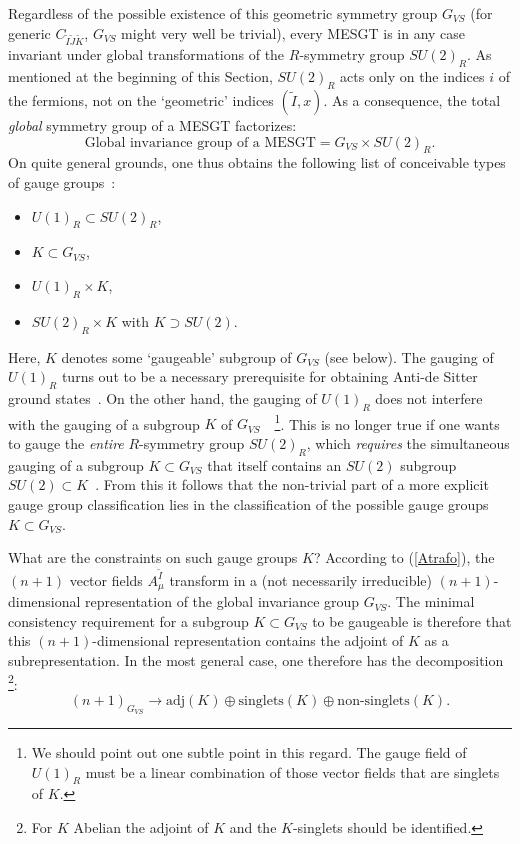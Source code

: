 \documentclass[a4paper,11pt]{article}
\newcommand{\ti}{\ensuremath{\tilde{I}}}
\newcommand{\tj}{\ensuremath{\tilde{J}}}
\newcommand{\tk}{\ensuremath{\tilde{K}}}
\begin{document}
Regardless of the possible existence of this geometric symmetry
group $G_{VS}$ (for generic $C_{\ti\tj\tk}$,  $G_{VS}$ might very
well be trivial), every MESGT is in any case invariant under
global transformations of the $R$-symmetry group $SU(2)_{R}$. As
mentioned at the beginning of this Section, $SU(2)_{R}$
acts only on the indices $i$ of the fermions, not on the
`geometric' indices $ (\ti, x)$. As a consequence, the total
\emph{global} symmetry group of a MESGT factorizes:
\begin{displaymath}
\textrm{Global invariance group of a MESGT}= G_{VS}\times
SU(2)_{R}.
\end{displaymath}
On quite general grounds, one thus
obtains the following list of conceivable types of gauge
groups~\cite{GST2,GZ1,GZ3}:
\begin{itemize}
\item $U(1)_{R}\subset SU(2)_{R}$,
\item $K\subset G_{VS}$,
\item $U(1)_{R}\times K$,
\item $SU(2)_{R}\times K$ with $K\supset SU(2)$.
\end{itemize}

Here, $K$ denotes some `gaugeable' subgroup of $G_{VS}$ (see below). The
gauging of $U(1)_{R}$ turns out to be a necessary prerequisite for
obtaining Anti-de Sitter ground states~\cite{GST2,GZ1,GZ2}. On the other
hand, the gauging of $U(1)_R$ does not interfere with the gauging of a
subgroup $K$ of $G_{VS}$~\cite{GZ1}~\footnote{ We should point out one
subtle point in this regard. The gauge field of $U(1)_R$ must be a linear
combination of those vector fields that are singlets of $K$.}. This is no
longer true if one wants to gauge the \emph{entire} $R$-symmetry group
$SU(2)_{R}$, which \emph{requires} the simultaneous gauging of a subgroup
$K\subset G_{VS}$ that itself contains an $SU(2)$ subgroup $SU(2)\subset
K$~\cite{GZ3}. From this it follows that the non-trivial part of a more
explicit gauge group classification lies in the classification of the
possible gauge groups $K\subset G_{VS}$. 

What are the constraints on such gauge groups $K$? According to
(\ref{Atrafo}), the $(n+1)$ vector fields $A_{\mu}^{\ti}$
transform in a (not necessarily irreducible) $(n+1)$-dimensional
representation of the global invariance group $G_{VS}$. The
minimal consistency requirement for a subgroup $K\subset G_{VS}$
to be gaugeable is therefore that this $(n+1)$-dimensional
representation contains the adjoint of $K$ as a subrepresentation.
In the most general case, one therefore has the decomposition
\footnote{For $K$ Abelian the adjoint of $K$ and the $K$-singlets
should be identified.}:
\begin{equation}
(n+1)_{G_{VS}}\longrightarrow \textrm{adj}(K) \oplus
\textrm{singlets}(K) \oplus \textrm{non-singlets}(K).
\end{equation}
\end{document}
